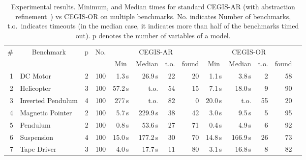 \documentclass[a4paper,UKenglish]{lipics-v2018}
\begin{document}
\begin{table}
\centering
\footnotesize
%
\begin{tabular}{| r | l | c | c | r | r | r | r | r | r | r | r | r |}
%
\hline
\# & \multicolumn{1}{|c|}{Benchmark} & \multicolumn{1}{|c|}{p} & \multicolumn{1}{|c|}{No.} & \multicolumn{4}{|c|}{CEGIS-AR} & \multicolumn{4}{|c|}{CEGIS-OR} \\
   &                                 & & \multicolumn{1}{|c|}{}  & \multicolumn{1}{|c|}{Min} & \multicolumn{1}{|c|}{Median} & \multicolumn{1}{|c|}{t.o.} & \multicolumn{1}{|c|}{found} & \multicolumn{1}{|c|}{Min} & \multicolumn{1}{|c|}{Median} & \multicolumn{1}{|c|}{t.o.} & \multicolumn{1}{|c|}{found}\\\hline
1  & DC Motor          & 2 & 100 & 1.3\,s & 26.9\,s& 22& 20& 1.1\,s &   3.8\,s & 2 & 58\\
2  & Helicopter        & 3  & 100 & 57.2\,s & t.o. & 54 & 15 & 7.1\,s  &   18.0\,s & 9 & 90\\
3  & Inverted Pendulum & 4 & 100 &  277\,s& t.o. & 82& 0 & 20.0\,s  &  t.o. & 55 & 20\\
4  & Magnetic Pointer  & 2  & 100 & 5.7\,s & 229.9\,s & 38 & 42 & 3.0\,s  &  9.5\,s & 5 & 95 \\
5  & Pendulum          & 2 & 100 & 0.8\,s & 53.6\,s & 27 & 71 &0.4\,s  &   4.9\,s & 6 & 92\\
6  & Suspension        & 4 & 100 &15.0\,s & 177.2\,s & 30 & 70 & 14.8\,s&166.9\,s  & 26 & 73\\
7  & Tape Driver       & 3 & 100 & 4.0\,s& 17.7\,s & 11 & 80 &3.1\,s  &   16.8\,s & 8 & 82\\
\hline
%
\end{tabular}
\vspace{0.05in}
\caption{\label{tab:cegis_results}
Experimental results.  Minimum, and Median times for standard CEGIS-AR (with
abstraction refinement~\cite{DBLP:conf/cav/AbateBCCDKKP17}) vs CEGIS-OR on
multiple benchmarks.  No.  indicates Number of benchmarks, t.o.~indicates
timeouts (in the median case, it indicates more than half of the benchmarks
timed out).  p denotes the number of variables of a model.}
\end{table}
\end{document}
